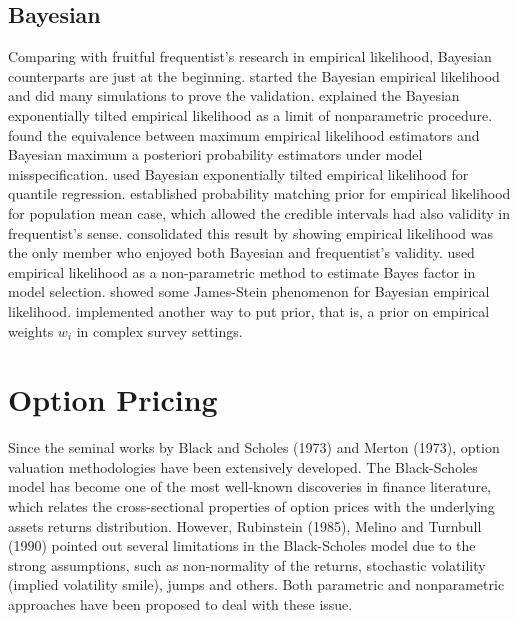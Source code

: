 \subsection{Bayesian }

Comparing with fruitful frequentist's research in empirical likelihood,
Bayesian counterparts are just at the beginning. \citet{lazar2003bayesian}
started the Bayesian empirical likelihood and did many simulations
to prove the validation. \citet{schennach2005bayesian,schennach2007point}
explained the Bayesian exponentially tilted empirical likelihood as
a limit of nonparametric procedure. \citet{grendar2009asymptotic}
found the equivalence between maximum empirical likelihood estimators
and Bayesian maximum a posteriori probability estimators under model
misspecification. \citet{lancaster2010bayesian} used Bayesian exponentially
tilted empirical likelihood for quantile regression. \citet{fang2005expected,fang2006empirical}
established probability matching prior for empirical likelihood for
population mean case, which allowed the credible intervals had also
validity in frequentist's sense. \citet{chang2008bayesian} consolidated
this result by showing empirical likelihood was the only member who
enjoyed both Bayesian and frequentist's validity. \citet{vexler2013nonparametric}
used empirical likelihood as a non-parametric method to estimate Bayes
factor in model selection. \citet{vexler2014posterior} showed some
James-Stein phenomenon for Bayesian empirical likelihood. \citet{rao2010bayesian}
implemented another way to put prior, that is, a prior on empirical
weights $w_{i}$ in complex survey settings.

\begin{comment}
more papers in abc folder, pro and con of el
\end{comment}



\section{Option Pricing}

Since the seminal works by Black and Scholes (1973) and Merton (1973),
option valuation methodologies have been extensively developed. The
Black-Scholes model has become one of the most well-known discoveries
in finance literature, which relates the cross-sectional properties
of option prices with the underlying assets returns distribution.
However, Rubinstein (1985), Melino and Turnbull (1990) pointed out
several limitations in the Black-Scholes model due to the strong assumptions,
such as non-normality of the returns, stochastic volatility (implied
volatility smile), jumps and others. Both parametric and nonparametric
approaches have been proposed to deal with these issue. 


